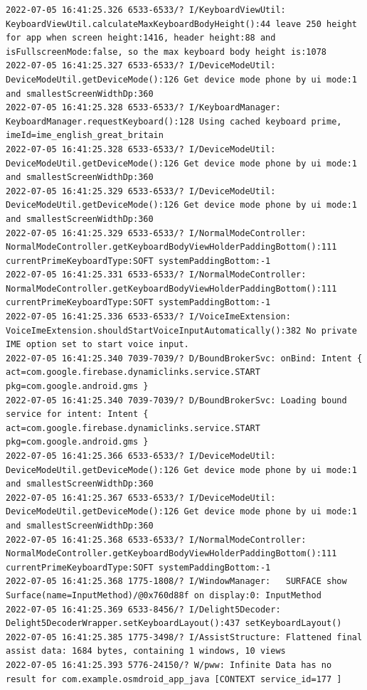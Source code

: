 \documentclass[a4paper,12pt]{book}
\begin{document}
\begin{lstlisting}
2022-07-05 16:41:25.326 6533-6533/? I/KeyboardViewUtil: KeyboardViewUtil.calculateMaxKeyboardBodyHeight():44 leave 250 height for app when screen height:1416, header height:88 and isFullscreenMode:false, so the max keyboard body height is:1078
2022-07-05 16:41:25.327 6533-6533/? I/DeviceModeUtil: DeviceModeUtil.getDeviceMode():126 Get device mode phone by ui mode:1 and smallestScreenWidthDp:360
2022-07-05 16:41:25.328 6533-6533/? I/KeyboardManager: KeyboardManager.requestKeyboard():128 Using cached keyboard prime, imeId=ime_english_great_britain
2022-07-05 16:41:25.328 6533-6533/? I/DeviceModeUtil: DeviceModeUtil.getDeviceMode():126 Get device mode phone by ui mode:1 and smallestScreenWidthDp:360
2022-07-05 16:41:25.329 6533-6533/? I/DeviceModeUtil: DeviceModeUtil.getDeviceMode():126 Get device mode phone by ui mode:1 and smallestScreenWidthDp:360
2022-07-05 16:41:25.329 6533-6533/? I/NormalModeController: NormalModeController.getKeyboardBodyViewHolderPaddingBottom():111 currentPrimeKeyboardType:SOFT systemPaddingBottom:-1
2022-07-05 16:41:25.331 6533-6533/? I/NormalModeController: NormalModeController.getKeyboardBodyViewHolderPaddingBottom():111 currentPrimeKeyboardType:SOFT systemPaddingBottom:-1
2022-07-05 16:41:25.336 6533-6533/? I/VoiceImeExtension: VoiceImeExtension.shouldStartVoiceInputAutomatically():382 No private IME option set to start voice input.
2022-07-05 16:41:25.340 7039-7039/? D/BoundBrokerSvc: onBind: Intent { act=com.google.firebase.dynamiclinks.service.START pkg=com.google.android.gms }
2022-07-05 16:41:25.340 7039-7039/? D/BoundBrokerSvc: Loading bound service for intent: Intent { act=com.google.firebase.dynamiclinks.service.START pkg=com.google.android.gms }
2022-07-05 16:41:25.366 6533-6533/? I/DeviceModeUtil: DeviceModeUtil.getDeviceMode():126 Get device mode phone by ui mode:1 and smallestScreenWidthDp:360
2022-07-05 16:41:25.367 6533-6533/? I/DeviceModeUtil: DeviceModeUtil.getDeviceMode():126 Get device mode phone by ui mode:1 and smallestScreenWidthDp:360
2022-07-05 16:41:25.368 6533-6533/? I/NormalModeController: NormalModeController.getKeyboardBodyViewHolderPaddingBottom():111 currentPrimeKeyboardType:SOFT systemPaddingBottom:-1
2022-07-05 16:41:25.368 1775-1808/? I/WindowManager:   SURFACE show Surface(name=InputMethod)/@0x760d88f on display:0: InputMethod
2022-07-05 16:41:25.369 6533-8456/? I/Delight5Decoder: Delight5DecoderWrapper.setKeyboardLayout():437 setKeyboardLayout()
2022-07-05 16:41:25.385 1775-3498/? I/AssistStructure: Flattened final assist data: 1684 bytes, containing 1 windows, 10 views
2022-07-05 16:41:25.393 5776-24150/? W/pww: Infinite Data has no result for com.example.osmdroid_app_java [CONTEXT service_id=177 ]

\end{lstlisting}
\end{document}
